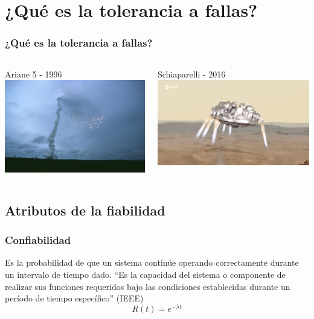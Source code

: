\section{¿Qué es la tolerancia a fallas?}
\begin{frame}
	\frametitle{¿Qué es la tolerancia a fallas?}
	\begin{columns}[T]
		\begin{column}{.5\textwidth}
			\centering
			Ariane 5 - 1996
			\vfill
			\includegraphics[scale=1]{images/ariane5.jpg}
		\end{column}
		\begin{column}{.5\textwidth}
			\centering
			Schiaparelli - 2016
			\vfill
			\includegraphics[scale=0.2]{images/mars.jpg}
		\end{column}
	\end{columns}    
\end{frame}

\subsection{Atributos de la fiabilidad}
\begin{frame}
	\frametitle{Confiabilidad}
	Es la probabilidad de que un sistema continúe operando correctamente durante un intervalo de tiempo dado. 
	“Es la capacidad del sistema o componente de realizar sus funciones requeridos bajo las condiciones establecidas durante un período de tiempo específico” (IEEE)
	\LARGE
	$$
	R(t) = e^{-\lambda t }
	$$
\end{frame}

